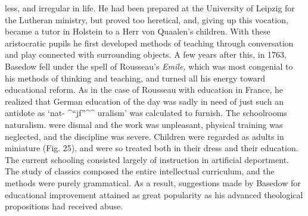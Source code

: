 \documentclass[]{book}
\begin{document}
less, and irregular in life. He had been prepared at the University of Leipzig for the Lutheran ministry, but proved too heretical, and, giving up this vocation, became a tutor in Holstein to a Herr von Quaalen's children. With these aristocratic pupils he first developed methods of teaching through conversation and play connected with surrounding objects. A few years after this, in 1763, Basedow fell under the spell of Rousseau's \emph{Emile,} which was most congenial to his methods of thinking and teaching, and turned all his energy toward educational reform. As in the case of Rousseau with education in France, he realized that German education of the day was sadly in need of just such an antidote as `nat- \^{}``jf''\^{}\^{} uralism' was calculated to furnish. The schoolrooms naturalism. were dismal and the work was unpleasant, physical training was neglected, and the discipline was severe. Children were regarded as adults in miniature (Fig. 25), and were so treated both in their dress and their education. The current schooling consisted largely of instruction in artificial deportment. The study of classics composed the entire intellectual curriculum, and the methods were purely grammatical. As a result, suggestions made by Basedow for educational improvement attained as great popularity as his advanced theological propositions had received abuse.
\end{document}
